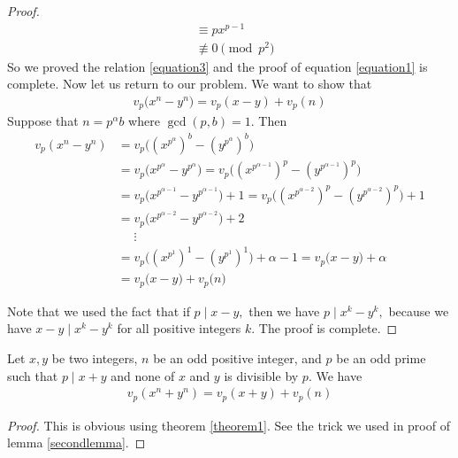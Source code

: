 \documentclass[main.tex]{subfile}
\begin{document}
\begin{proof}
\begin{align*}
                & \equiv px^{p-1}\\
                & \not \equiv 0 \pmod{p^2}
            \end{align*}
        So we proved the relation \eqref{equation3} and the proof of equation \eqref{equation1} is complete.  Now let us return to our problem. We want to show that
            \begin{align*}
            	v_p\big(  x^n - y^n \big) = v_p(  x - y ) + v_p(  n )
            \end{align*}
        Suppose that $n=p^{\alpha}b$ where $\gcd(p,b)=1.$ Then
            \begin{align*}
                v_p(x^n-y^n) & =  v_p\big((x^{p^{\alpha}})^b - (y^{p^{\alpha}})^b \big)  \\
                & =   v_p\big(  x^{p^{\alpha}} -y^{p^{\alpha}}\big) =v_p\big(  (x^{p^{\alpha-1}})^p - (y^{p^{\alpha-1}})^p \big) \\
                & = v_p\big(  x^{p^{\alpha-1}} - y^{p^{\alpha-1}} \big) + 1 =v_p\big(  (x^{p^{\alpha-2}})^p - (y^{p^{\alpha-2}})^p\big) +1  \\
                & = v_p\big(  x^{p^{\alpha-2}} - y^{p^{\alpha-2}} \big) + 2 \\
                & \phantom{=} \vdots \\
                & = v_p\big(  (x^{p^{1}})^1 - (y^{p^{1}})^1  \big) + \alpha -1  = v_p\big(  x-y \big) + \alpha \\
                & =v_p\big(  x-y \big) + v_p\big(  n \big)
            \end{align*}

        Note that we used the fact that if $p \mid x-y,$ then we have $p \mid x^k -y^k,$ because we have $x-y \mid x^k-y^k$ for all positive integers $k.$ The proof is complete.
    \end{proof}



    \begin{theorem}\label{theorem2}
        Let $ x,y$ be two integers, $n$ be an odd positive integer, and $p$ be an odd prime such that $ p\mid x + y$ and none of
        $x$ and $y$ is divisible by $p.$  We have
        	\begin{align*}
        		v_p(  x^n + y^n ) = v_p(  x + y ) + v_p(  n )
        	\end{align*}
    \end{theorem}

    \begin{proof}
        This is obvious using theorem \eqref{theorem1}. See the trick we used in proof of lemma \eqref{secondlemma}.
	\end{proof}
\end{document}
